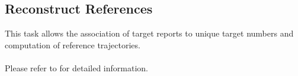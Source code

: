 
\subsection{Reconstruct References}
\label{sec:ui_proc_reconst_references}

This task allows the association of target reports to unique target numbers and computation of reference trajectories. \\
\\

Please refer to  for detailed information.
